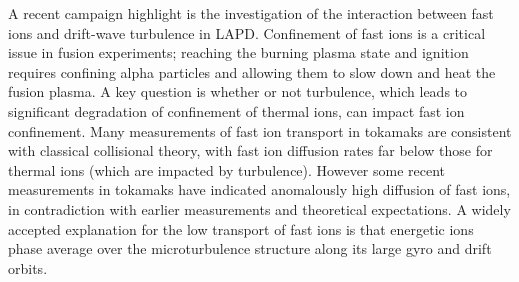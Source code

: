 \documentclass[11pt]{article}
\begin{document}
A recent campaign highlight is the investigation of the interaction
between fast ions and drift-wave turbulence in LAPD.  Confinement of
fast ions is a critical issue in fusion experiments; reaching the
burning plasma state and ignition requires confining alpha particles
and allowing them to slow down and heat the fusion plasma.
 A key
question is whether or not turbulence, which leads to significant
degradation of confinement of thermal ions, can impact fast ion confinement.
Many measurements of fast ion transport in
tokamaks are consistent with classical collisional theory, with fast
ion diffusion rates far below those for thermal ions (which are
impacted by turbulence).  
However some recent measurements in tokamaks
have indicated anomalously high diffusion of fast ions, in
contradiction with earlier measurements and theoretical expectations.
A widely accepted explanation for the low transport of fast ions is that
energetic ions phase average over the microturbulence structure
along its large gyro and drift orbits.
\end{document}

